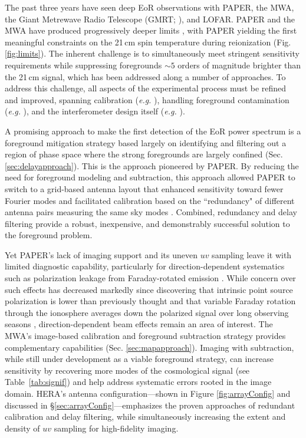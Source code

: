 \documentclass[preprint,11pt]{aastex}
\newcommand{\Mycitep}[1]{\citep{#1}}
\begin{document}
The past three years have seen deep EoR observations with PAPER, the MWA, 
the Giant Metrewave Radio Telescope (GMRT; \citealt{paciga_et_al2013}), and LOFAR.
PAPER and the MWA have produced progressively deeper limits
\citep{dillon_et_al2014,dillon_et_al2015,parsons_etal2014,ali_et_al2015}, with PAPER
yielding the first meaningful constraints on the 21\,cm spin temperature during reionization
(Fig. \ref{fig:limits}). %
The inherent challenge is to simultaneously meet stringent sensitivity requirements 
while suppressing foregrounds $\sim5$ orders of magnitude
brighter than the 21\,cm signal, which has been addressed along a number of approaches.  
To address this challenge,  all aspects of the experimental process must be refined and improved, spanning 
calibration ({\em e.g.} \cite{zheng_et_al2014, jacobs_et_al2016, barry_et_al2016}), handling foreground contamination
({\em e.g.} \cite{moore_et_al2013,thyagarajan_et_al2015a,pober_et_al2016}),
and the interferometer design itself ({\em e.g.} \cite{parsons_et_al2012a,dillon_parsons2016}).

A promising approach to make the first detection of the EoR power spectrum 
is a foreground mitigation strategy based largely
on identifying and filtering out a region of phase space where the strong foregrounds are largely confined (Sec. \ref{sec:delayapproach}).  This is the approach
pioneered by PAPER.
By reducing the need
for foreground modeling and subtraction, this approach allowed PAPER to switch to a grid-based antenna layout that
enhanced sensitivity toward fewer Fourier modes and facilitated calibration
based on the ``redundancy" of different antenna pairs measuring the same sky modes \citep{liu_et_al2010,zheng_et_al2014}.
Combined, redundancy and delay filtering provide a robust, inexpensive, and demonstrably successful solution 
to the foreground problem.

Yet PAPER's lack of imaging support and its uneven $uv$ sampling 
leave it with limited diagnostic capability, particularly for direction-dependent systematics
such as polarization leakage from Faraday-rotated emission \Mycitep{moore_et_al2013, nunhokee_etal_2016}.
While concern over such effects has decreased markedly since discovering that
intrinsic point source polarization is lower than previously thought
\citep{asad_et_al2015} and that variable Faraday rotation through the
ionosphere averages down the polarized signal over long observing seasons
\Mycitep{moore_et_al2016,aguirre_etal_2016}, direction-dependent beam effects remain an area of interest.
The MWA's image-based calibration and foreground subtraction strategy provides complementary
capabilities (Sec. \ref{sec:mapapproach}). Imaging with subtraction, while still under development as a viable foreground strategy,
can increase sensitivity by recovering more modes of the cosmological signal (see
Table~\ref{tab:signif}) and help address systematic errors rooted
in the image domain.  HERA's antenna configuration---shown in Figure \ref{fig:arrayConfig} and discussed in \S\ref{sec:arrayConfig}---emphasizes
the proven approaches of redundant calibration and delay filtering, while simultaneously
increasing the extent and density of $uv$ sampling for high-fidelity imaging.  
\end{document}

